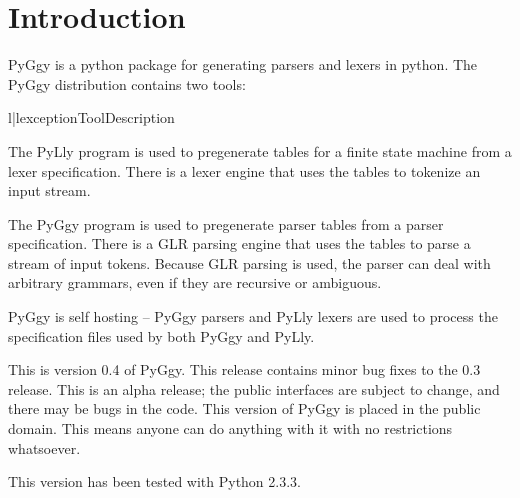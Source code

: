 \chapter{Introduction}

PyGgy is a python package for generating parsers and lexers in python.
The PyGgy distribution contains two tools:

\begin{tableii}{l|l}{exception}{Tool}{Description}
\end{tableii}

The PyLly program is used to pregenerate tables for a finite state
machine from a lexer specification.  There is a lexer engine that uses
the tables to tokenize an input stream.

The PyGgy program is used to pregenerate parser tables from a parser
specification.  There is a GLR parsing engine that uses the tables 
to parse a stream of input tokens.  Because GLR parsing is used, the
parser can deal with arbitrary grammars, even if they are recursive
or ambiguous.

PyGgy is self hosting -- PyGgy parsers and PyLly lexers are used
to process the specification files used by both PyGgy and PyLly.

This is version 0.4 of PyGgy.  This release contains minor bug fixes
to the 0.3 release.
This is an alpha release;  the public interfaces are subject to
change, and there may be bugs in the code.  This
version of PyGgy is placed in the public domain.  This means anyone
can do anything with it with no restrictions whatsoever.

This version has been tested with Python 2.3.3.

